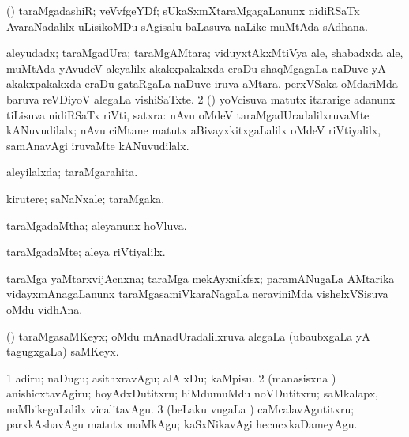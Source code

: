 \bentry
{} 
\gl{\nA}
\expl{}
\bmng
(\viduyx) taraMgadashiR; veVvfgeYDf; sUkaSxmXtaraMgagaLanunx nidiRSaTx AvaraNadalilx uLisikoMDu sAgisalu baLasuva naLike muMtAda sAdhana. 
\emng
\eentry

\bentry
{} 
\gl{\nA}
\expl{}
\bmng
\bnum
{} 
\banum
{} aleyudadx; taraMgadUra; taraMgAMtara; viduyxtAkxMtiVya ale, shabadxda ale, muMtAda yAvudeV aleyalilx akakxpakakxda eraDu shaqMgagaLa naDuve yA akakxpakakxda eraDu gataRgaLa naDuve iruva aMtara. 
 perxVSaka oMdariMda baruva reVDiyoV alegaLa vishiSaTxte. 
\eanum
\numie
\num{2} (\AmA) yoVcisuva matutx itararige adanunx tiLisuva nidiRSaTx riVti, satxra:  nAvu oMdeV taraMgadUradalilxruvaMte kANuvudilalx; nAvu ciMtane matutx aBivayxkitxgaLalilx oMdeV riVtiyalilx, samAnavAgi iruvaMte kANuvudilalx. 
\enum
\emng
\eentry

\bentry
{} 
\gl{\gu}
\expl{}
\bmng
aleyilalxda; taraMgarahita. 
\emng
\eentry

\bentry
{} 
\gl{\nA}
\expl{}
\bmng
kirutere; saNaNxale; taraMgaka. 
\emng
\eentry

\bentry
{} 
\gl{\gu}
\expl{}
\bmng
taraMgadaMtha; aleyanunx hoVluva. 
\emng
\eentry

\bentry
{} 
\gl{\kirxvi}
\expl{}
\bmng
taraMgadaMte; aleya riVtiyalilx. 
\emng
\eentry

\bentry
{} 
\gl{\nA}
\expl{}
\bmng
taraMga yaMtarxvijAcnxna; taraMga mekAyxnikfsx; paramANugaLa AMtarika vidayxmAnagaLanunx taraMgasamiVkaraNagaLa neraviniMda vishelxVSisuva oMdu vidhAna. 
\emng
\eentry

\bentry
{} 
\gl{\nA}
\expl{}
\bmng
(\Bwvi) taraMgasaMKeyx; oMdu mAnadUradalilxruva alegaLa (ubaubxgaLa yA tagugxgaLa) saMKeyx. 
\emng
\eentry

\bentry
{} 
\gl{\akirx}
\expl{}
\bmng
\bnum
\num{1} adiru; naDugu; asithxravAgu; alAlxDu; kaMpisu. 
\num{2} (manasisxna \vi) anishicxtavAgiru; hoyAdxDutitxru; hiMdumuMdu noVDutitxru; saMkalapx, naMbikegaLalilx vicalitavAgu. 
\num{3} (beLaku \mo vugaLa \vi) caMcalavAgutitxru; parxkAshavAgu matutx maMkAgu; kaSxNikavAgi hecucxkaDameyAgu. 
\enum
\emng
\eentry

